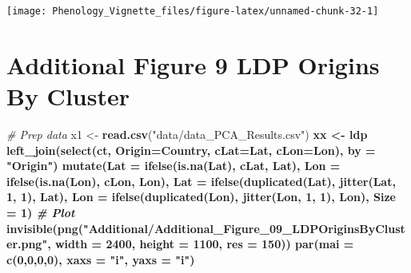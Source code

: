 \documentclass[
]{article}
\newenvironment{Shaded}{\begin{snugshade}}{\end{snugshade}}
\newcommand{\CommentTok}[1]{\textcolor[rgb]{0.56,0.35,0.01}{\textit{#1}}}
\newcommand{\DataTypeTok}[1]{\textcolor[rgb]{0.13,0.29,0.53}{#1}}
\newcommand{\DecValTok}[1]{\textcolor[rgb]{0.00,0.00,0.81}{#1}}
\newcommand{\KeywordTok}[1]{\textcolor[rgb]{0.13,0.29,0.53}{\textbf{#1}}}
\newcommand{\NormalTok}[1]{#1}
\newcommand{\OperatorTok}[1]{\textcolor[rgb]{0.81,0.36,0.00}{\textbf{#1}}}
\newcommand{\StringTok}[1]{\textcolor[rgb]{0.31,0.60,0.02}{#1}}
\begin{document}
\texttt{[image: Phenology\_Vignette\_files/figure-latex/unnamed-chunk-32-1]}

\hypertarget{additional-figure-9-ldp-origins-by-cluster}{%
\section{Additional Figure 9 LDP Origins By
Cluster}\label{additional-figure-9-ldp-origins-by-cluster}}

\begin{Shaded}
\begin{Highlighting}[]
\CommentTok{# Prep data}
\NormalTok{x1 <-}\StringTok{ }\KeywordTok{read.csv}\NormalTok{(}\StringTok{"data/data_PCA_Results.csv"}\NormalTok{) }\OperatorTok{%
\NormalTok{xx <-}\StringTok{ }\NormalTok{ldp }\OperatorTok{%
\StringTok{  }\KeywordTok{left_join}\NormalTok{(}\KeywordTok{select}\NormalTok{(ct, }\DataTypeTok{Origin=}\NormalTok{Country, }\DataTypeTok{cLat=}\NormalTok{Lat, }\DataTypeTok{cLon=}\NormalTok{Lon), }\DataTypeTok{by =} \StringTok{"Origin"}\NormalTok{) }\OperatorTok{%
\StringTok{  }\KeywordTok{mutate}\NormalTok{(}\DataTypeTok{Lat =} \KeywordTok{ifelse}\NormalTok{(}\KeywordTok{is.na}\NormalTok{(Lat), cLat, Lat),}
         \DataTypeTok{Lon =} \KeywordTok{ifelse}\NormalTok{(}\KeywordTok{is.na}\NormalTok{(Lon), cLon, Lon),}
         \DataTypeTok{Lat =} \KeywordTok{ifelse}\NormalTok{(}\KeywordTok{duplicated}\NormalTok{(Lat), }\KeywordTok{jitter}\NormalTok{(Lat, }\DecValTok{1}\NormalTok{, }\DecValTok{1}\NormalTok{), Lat),}
         \DataTypeTok{Lon =} \KeywordTok{ifelse}\NormalTok{(}\KeywordTok{duplicated}\NormalTok{(Lon), }\KeywordTok{jitter}\NormalTok{(Lon, }\DecValTok{1}\NormalTok{, }\DecValTok{1}\NormalTok{), Lon), }\DataTypeTok{Size =} \DecValTok{1}\NormalTok{)}
\CommentTok{# Plot}
\KeywordTok{invisible}\NormalTok{(}\KeywordTok{png}\NormalTok{(}\StringTok{"Additional/Additional_Figure_09_LDPOriginsByCluster.png"}\NormalTok{, }\DataTypeTok{width =} \DecValTok{2400}\NormalTok{, }\DataTypeTok{height =} \DecValTok{1100}\NormalTok{, }\DataTypeTok{res =} \DecValTok{150}\NormalTok{))}
\KeywordTok{par}\NormalTok{(}\DataTypeTok{mai =} \KeywordTok{c}\NormalTok{(}\DecValTok{0}\NormalTok{,}\DecValTok{0}\NormalTok{,}\DecValTok{0}\NormalTok{,}\DecValTok{0}\NormalTok{), }\DataTypeTok{xaxs =} \StringTok{"i"}\NormalTok{, }\DataTypeTok{yaxs =} \StringTok{"i"}\NormalTok{)}
}}}
\end{Highlighting}
\end{Shaded}
\end{document}
